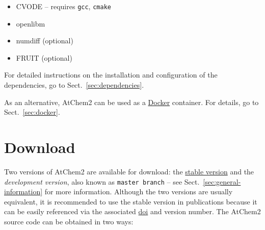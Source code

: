 \begin{itemize}
\item CVODE -- requires \texttt{gcc}, \texttt{cmake} %
\item openlibm
\item numdiff (optional)
\item FRUIT (optional)
\end{itemize}

For detailed instructions on the installation and configuration of the
dependencies, go to Sect.~\ref{sec:dependencies}.

As an alternative, AtChem2 can be used as a \href{https://www.docker.com}{Docker}
container. For details, go to Sect.~\ref{sec:docker}.

\section{Download} \label{sec:download}

Two versions of AtChem2 are available for download: the
\href{https://github.com/AtChem/AtChem2/releases}{stable version} and
the \emph{development version}, also known as \texttt{master\ branch}
-- see Sect.~\ref{sec:general-information} for more information.
Although the two versions are usually equivalent, it is recommended to use
the stable version in publications because it can be easily referenced via
the associated \href{https://www.doi.org/the-identifier/what-is-a-doi}{doi}
and version number. The AtChem2 source code can be obtained in two ways:

